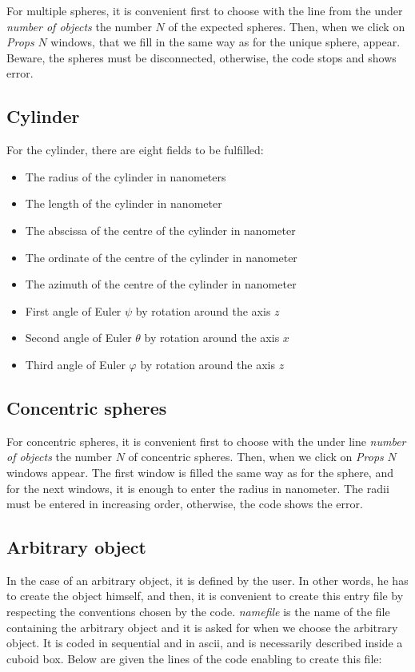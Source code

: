For multiple spheres, it is convenient first to choose with the line 
from the under {\it number of objects} the number $N$ of the expected
spheres. Then, when we click on {\it Props} $N$ windows, that we fill 
in the same way as for the unique sphere, appear. 
Beware, the spheres must be disconnected, otherwise, the code stops 
and shows error. 

\subsection{Cylinder}

For the cylinder, there are eight fields to be fulfilled:

\begin{itemize}
\item The radius of the cylinder in nanometers
\item The length of the cylinder in nanometer
\item The abscissa of the centre of the cylinder in nanometer
\item The ordinate of the centre of the cylinder in nanometer
\item The azimuth of the centre of the cylinder in nanometer
\item First angle of Euler $\psi$ by rotation around the axis $z$
\item Second angle of Euler $\theta$ by rotation around the axis $x$
\item Third angle of Euler $\varphi$ by rotation around the axis $z$
\end{itemize}


\subsection{Concentric spheres}

For concentric spheres, it is convenient first to choose with the
under line {\it number of objects} the number $N$ of concentric
spheres. Then, when we click on {\it Props} $N$ windows appear. The
first window is filled the same way as for the sphere, and for the
next windows, it is enough to enter the radius in nanometer.  The
radii must be entered in increasing order, otherwise, the code
shows the error.

\subsection{Arbitrary object}

In the case of an arbitrary object, it is defined by the user. In
other words, he has to create the object himself, and then, it is
convenient to create this entry file by respecting the conventions
chosen by the code. {\it namefile} is the name of the file containing
the arbitrary object and it is asked for when we choose the arbitrary
object. It is coded in sequential and in ascii, and is necessarily
described inside a cuboid box. Below are given the lines of
the code enabling to create this file:

